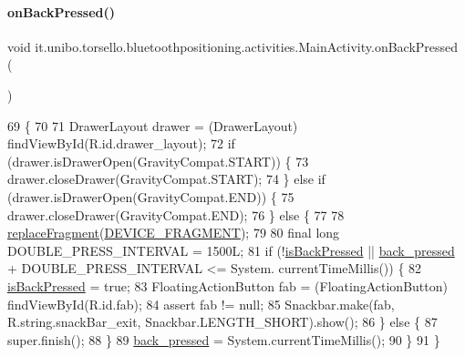 \paragraph{\texorpdfstring{on\+Back\+Pressed()}{onBackPressed()}}
{\footnotesize\ttfamily void it.\+unibo.\+torsello.\+bluetoothpositioning.\+activities.\+Main\+Activity.\+on\+Back\+Pressed (\begin{DoxyParamCaption}{ }\end{DoxyParamCaption})}


\begin{DoxyCode}
69                                 \{
70 
71         DrawerLayout drawer = (DrawerLayout) findViewById(R.id.drawer\_layout);
72         \textcolor{keywordflow}{if} (drawer.isDrawerOpen(GravityCompat.START)) \{
73             drawer.closeDrawer(GravityCompat.START);
74         \} \textcolor{keywordflow}{else} \textcolor{keywordflow}{if} (drawer.isDrawerOpen(GravityCompat.END)) \{
75             drawer.closeDrawer(GravityCompat.END);
76         \} \textcolor{keywordflow}{else} \{
77 
78             \hyperlink{classit_1_1unibo_1_1torsello_1_1bluetoothpositioning_1_1activities_1_1MainActivity_a98db4478d28cd91118138d0b652ceb2c_a98db4478d28cd91118138d0b652ceb2c}{replaceFragment}(\hyperlink{classit_1_1unibo_1_1torsello_1_1bluetoothpositioning_1_1activities_1_1MainActivity_a2f77c0245ac2525dc58905e38e1817d1_a2f77c0245ac2525dc58905e38e1817d1}{DEVICE\_FRAGMENT});
79 
80             \textcolor{keyword}{final} \textcolor{keywordtype}{long} DOUBLE\_PRESS\_INTERVAL = 1500L;
81             \textcolor{keywordflow}{if} (!\hyperlink{classit_1_1unibo_1_1torsello_1_1bluetoothpositioning_1_1activities_1_1MainActivity_a73d74411ec7bb55eb827bb81018174bd_a73d74411ec7bb55eb827bb81018174bd}{isBackPressed} || \hyperlink{classit_1_1unibo_1_1torsello_1_1bluetoothpositioning_1_1activities_1_1MainActivity_a5e1ae38b2bbdcc45f2164fdc393ca495_a5e1ae38b2bbdcc45f2164fdc393ca495}{back\_pressed} + DOUBLE\_PRESS\_INTERVAL <= System.
      currentTimeMillis()) \{
82                 \hyperlink{classit_1_1unibo_1_1torsello_1_1bluetoothpositioning_1_1activities_1_1MainActivity_a73d74411ec7bb55eb827bb81018174bd_a73d74411ec7bb55eb827bb81018174bd}{isBackPressed} = \textcolor{keyword}{true};
83                 FloatingActionButton fab = (FloatingActionButton) findViewById(R.id.fab);
84                 assert fab != null;
85                 Snackbar.make(fab, R.string.snackBar\_exit, Snackbar.LENGTH\_SHORT).show();
86             \} \textcolor{keywordflow}{else} \{
87                 super.finish();
88             \}
89             \hyperlink{classit_1_1unibo_1_1torsello_1_1bluetoothpositioning_1_1activities_1_1MainActivity_a5e1ae38b2bbdcc45f2164fdc393ca495_a5e1ae38b2bbdcc45f2164fdc393ca495}{back\_pressed} = System.currentTimeMillis();
90         \}
91     \}
\end{DoxyCode}
